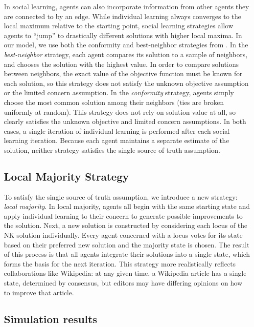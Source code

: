 \documentclass[letterpaper,twocolumn,10pt]{article}
\newcommand{\+}{\phantom{-}}
\begin{document}
In social learning,
agents can also incorporate information from
other agents they are connected to by an edge.
While individual learning always converges to the local maximum relative to the starting point,
social learning strategies allow agents to ``jump'' to drastically different solutions with higher local maxima.
In our model, we use both the conformity and best-neighbor strategies from \cite{barkoczi_social_2016}.
In the {\em best-neighbor} strategy, each agent compares its solution to a sample of neighbors, and chooses the solution with the highest value.
In order to compare solutions between neighbors,
the exact value of the objective function must be known for each solution,
so this strategy does not satisfy the unknown objective assumption
or the limited concern assumption.
In the {\em conformity} strategy, agents simply choose the most common solution among their neighbors
(ties are broken uniformly at random).
This strategy does not rely on solution value at all, so clearly satisfies the
unknown objective and limited concern assumptions.
In both cases, a single iteration of individual learning is performed after each social learning
iteration.
Because each agent maintains a separate estimate of the solution,
neither strategy satisfies the single source of truth assumption.

\subsection{Local Majority Strategy}

To satisfy the single source of truth assumption,
we introduce a new strategy: {\em local majority}.
In local majority, agents all begin with the same starting state and apply individual learning to their concern to generate
possible improvements to the solution.
Next, a new solution is constructed by considering each locus of the NK solution
individually.
Every agent concerned with a locus votes for its state based on their preferred
new solution and the majority state is chosen.
The result of this process is that all agents integrate their solutions into
a single state,
which forms the basis for the next iteration.
This strategy more realistically reflects collaborations like Wikipedia:
at any given time, a Wikipedia article has a single state, determined by consensus,
but editors may have differing opinions on how to improve that article.

\subsection{Simulation results}
\end{document}
